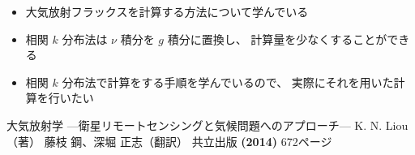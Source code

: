 \documentclass[article]{dennou777}
\begin{document}
\begin{itemize}
	\item 大気放射フラックスを計算する方法について学んでいる
	\item 相関 $k$ 分布法は $\nu$ 積分を $g$ 積分に置換し、
		計算量を少なくすることができる
\end{itemize}

\begin{itemize}
	\item 相関 $k$ 分布法で計算をする手順を学んでいるので、
		実際にそれを用いた計算を行いたい
\end{itemize}

\begin{thebibliography}{9}
	 大気放射学 ---衛星リモートセンシングと気候問題へのアプローチ---
		K. N. Liou（著） 藤枝 鋼、深堀 正志（翻訳）
		共立出版 \textbf{(2014)} 672ページ
\end{thebibliography}
\end{document}
